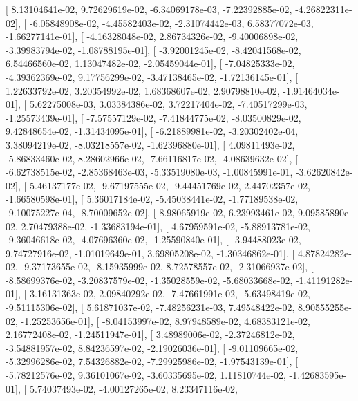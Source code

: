 \documentclass{article}
\begin{document}
       [  8.13104641e-02,   9.72629619e-02,  -6.34069178e-03,
         -7.22392885e-02,  -4.26822311e-02],
       [ -6.05848908e-02,  -4.45582403e-02,  -2.31074442e-03,
          6.58377072e-03,  -1.66277141e-01],
       [ -4.16328048e-02,   2.86734326e-02,  -9.40006898e-02,
         -3.39983794e-02,  -1.08788195e-01],
       [ -3.92001245e-02,  -8.42041568e-02,   6.54466560e-02,
          1.13047482e-02,  -2.05459044e-01],
       [ -7.04825333e-02,  -4.39362369e-02,   9.17756299e-02,
         -3.47138465e-02,  -1.72136145e-01],
       [  1.22633792e-02,   3.20354992e-02,   1.68368607e-02,
          2.90798810e-02,  -1.91464034e-01],
       [  5.62275008e-03,   3.03384386e-02,   3.72217404e-02,
         -7.40517299e-03,  -1.25573439e-01],
       [ -7.57557129e-02,  -7.41844775e-02,  -8.03500829e-02,
          9.42848654e-02,  -1.31434095e-01],
       [ -6.21889981e-02,  -3.20302402e-04,   3.38094219e-02,
         -8.03218557e-02,  -1.62396880e-01],
       [  4.09811493e-02,  -5.86833460e-02,   8.28602966e-02,
         -7.66116817e-02,  -4.08639632e-02],
       [ -6.62738515e-02,  -2.85368463e-03,  -5.33519080e-03,
         -1.00845991e-01,  -3.62620842e-02],
       [  5.46137177e-02,  -9.67197555e-02,  -9.44451769e-02,
          2.44702357e-02,  -1.66580598e-01],
       [  5.36017184e-02,  -5.45038441e-02,  -1.77189538e-02,
         -9.10075227e-04,  -8.70009652e-02],
       [  8.98065919e-02,   6.23993461e-02,   9.09585890e-02,
          2.70479388e-02,  -1.33683194e-01],
       [  4.67959591e-02,  -5.88913781e-02,  -9.36046618e-02,
         -4.07696360e-02,  -1.25590840e-01],
       [ -3.94488023e-02,   9.74727916e-02,  -1.01019649e-01,
          3.69805208e-02,  -1.30346862e-01],
       [  4.87824282e-02,  -9.37173655e-02,  -8.15935999e-02,
          8.72578557e-02,  -2.31066937e-02],
       [ -8.58699376e-02,  -3.20837579e-02,  -1.35028559e-02,
         -5.68033668e-02,  -1.41191282e-01],
       [  3.16131363e-02,   2.09840292e-02,  -7.47661991e-02,
         -5.63498419e-02,  -9.51115306e-02],
       [  5.61871037e-02,  -7.48256231e-03,   7.49548422e-02,
          8.90555255e-02,  -1.25253656e-01],
       [ -8.04153997e-02,   8.97948589e-02,   4.68383121e-02,
          2.16772408e-02,  -1.24511947e-01],
       [  3.48989006e-02,  -2.37246812e-02,  -3.54881957e-02,
          8.84236597e-02,  -2.19026036e-01],
       [ -9.01109665e-02,  -5.32996286e-02,   7.54326882e-02,
         -7.29925986e-02,  -1.97543139e-01],
       [ -5.78212576e-02,   9.36101067e-02,  -3.60335695e-02,
          1.11810744e-02,  -1.42683595e-01],
       [  5.74037493e-02,  -4.00127265e-02,   8.23347116e-02,
\end{document}
